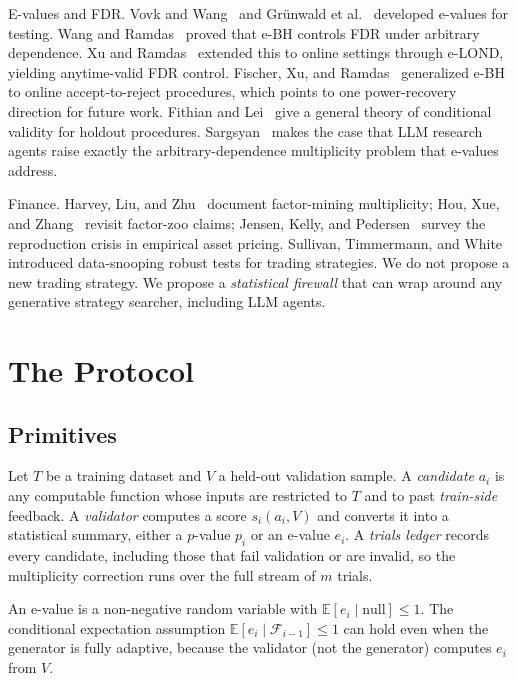 \documentclass[sigconf]{acmart}
\theoremstyle{plain}
\begin{document}
E-values and FDR. Vovk and Wang~\cite{vovk2021} and Gr\"{u}nwald et
al.~\cite{grunwald2024} developed e-values for testing. Wang and
Ramdas~\cite{wang2022} proved that e-BH controls FDR under arbitrary
dependence. Xu and Ramdas~\cite{xu2024} extended this to online settings
through e-LOND, yielding anytime-valid FDR control. Fischer, Xu, and
Ramdas~\cite{fischer2024} generalized e-BH to online accept-to-reject
procedures, which points to one power-recovery direction for future work.
Fithian and Lei~\cite{fithian2022} give a
general theory of conditional validity for holdout procedures.
Sargsyan~\cite{sargsyan2025} makes the case that LLM research agents raise
exactly the arbitrary-dependence multiplicity problem that e-values address.

Finance. Harvey, Liu, and Zhu~\cite{harvey2016} document factor-mining
multiplicity; Hou, Xue, and Zhang~\cite{hou2017} revisit factor-zoo claims;
Jensen, Kelly, and Pedersen~\cite{jensen2023} survey the reproduction crisis
in empirical asset pricing. Sullivan, Timmermann, and
White~\cite{sullivan1999} introduced data-snooping robust tests for trading
strategies. We do not propose a new trading strategy. We propose a
\emph{statistical firewall} that can wrap around any generative strategy
searcher, including LLM agents.

\section{The Protocol}\label{sec:protocol}

\subsection{Primitives}

Let $T$ be a training dataset and $V$ a held-out validation sample. A \emph{
candidate} $a_i$ is any computable function whose inputs are restricted to
$T$ and to past \emph{train-side} feedback. A \emph{validator} computes a
score $s_i(a_i,V)$ and converts it into a statistical summary, either a
$p$-value $p_i$ or an e-value $e_i$. A \emph{trials ledger} records every
candidate, including those that fail validation or are invalid, so the
multiplicity correction runs over the full stream of $m$ trials.

An e-value is a non-negative random variable with $\mathbb{E}[e_i\mid\text{null}]\le 1$.
The conditional expectation assumption
$\mathbb{E}[e_i\mid\mathcal{F}_{i-1}]\le 1$ can hold even when the generator is
fully adaptive, because the validator (not the generator) computes $e_i$ from
$V$.
\end{document}

